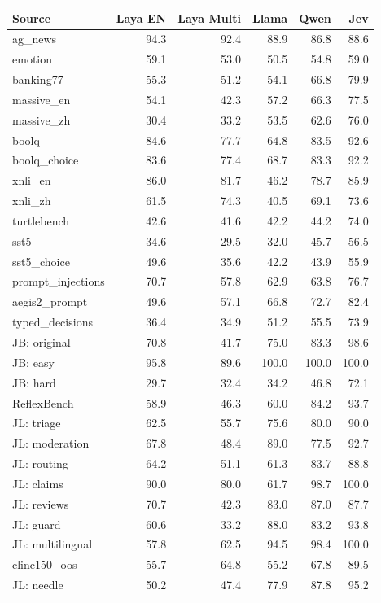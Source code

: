 \begin{tabular}{lrrrrr}
\toprule
Source & Laya EN & Laya Multi & Llama & Qwen & Jev \\
\midrule
ag\_news & 94.3 & 92.4 & 88.9 & 86.8 & 88.6 \\
emotion & 59.1 & 53.0 & 50.5 & 54.8 & 59.0 \\
banking77 & 55.3 & 51.2 & 54.1 & 66.8 & 79.9 \\
massive\_en & 54.1 & 42.3 & 57.2 & 66.3 & 77.5 \\
massive\_zh & 30.4 & 33.2 & 53.5 & 62.6 & 76.0 \\
boolq & 84.6 & 77.7 & 64.8 & 83.5 & 92.6 \\
boolq\_choice & 83.6 & 77.4 & 68.7 & 83.3 & 92.2 \\
xnli\_en & 86.0 & 81.7 & 46.2 & 78.7 & 85.9 \\
xnli\_zh & 61.5 & 74.3 & 40.5 & 69.1 & 73.6 \\
turtlebench & 42.6 & 41.6 & 42.2 & 44.2 & 74.0 \\
sst5 & 34.6 & 29.5 & 32.0 & 45.7 & 56.5 \\
sst5\_choice & 49.6 & 35.6 & 42.2 & 43.9 & 55.9 \\
prompt\_injections & 70.7 & 57.8 & 62.9 & 63.8 & 76.7 \\
aegis2\_prompt & 49.6 & 57.1 & 66.8 & 72.7 & 82.4 \\
typed\_decisions & 36.4 & 34.9 & 51.2 & 55.5 & 73.9 \\
JB: original & 70.8 & 41.7 & 75.0 & 83.3 & 98.6 \\
JB: easy & 95.8 & 89.6 & 100.0 & 100.0 & 100.0 \\
JB: hard & 29.7 & 32.4 & 34.2 & 46.8 & 72.1 \\
ReflexBench & 58.9 & 46.3 & 60.0 & 84.2 & 93.7 \\
JL: triage & 62.5 & 55.7 & 75.6 & 80.0 & 90.0 \\
JL: moderation & 67.8 & 48.4 & 89.0 & 77.5 & 92.7 \\
JL: routing & 64.2 & 51.1 & 61.3 & 83.7 & 88.8 \\
JL: claims & 90.0 & 80.0 & 61.7 & 98.7 & 100.0 \\
JL: reviews & 70.7 & 42.3 & 83.0 & 87.0 & 87.7 \\
JL: guard & 60.6 & 33.2 & 88.0 & 83.2 & 93.8 \\
JL: multilingual & 57.8 & 62.5 & 94.5 & 98.4 & 100.0 \\
clinc150\_oos & 55.7 & 64.8 & 55.2 & 67.8 & 89.5 \\
JL: needle & 50.2 & 47.4 & 77.9 & 87.8 & 95.2 \\
\bottomrule
\end{tabular}
